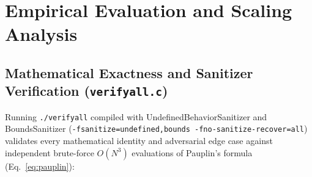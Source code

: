 \documentclass[11pt,a4paper]{article}
\makeatletter
\DeclareRobustCommand{\_}{\ifmmode\nfss@text{\textunderscore}\else\textunderscore\allowbreak\fi}
\theoremstyle{definition}
\makeatother
\begin{document}
\section{Empirical Evaluation and Scaling Analysis}
\label{sec:experiments}

\subsection{Mathematical Exactness and Sanitizer Verification (\texttt{verify\_all.c})}
Running \texttt{./verify\_all} compiled with Undefined\-Behavior\-Sanitizer and Bounds\-Sanitizer (\texttt{-fsanitize=undefined,bounds -fno-sanitize-recover=all}) validates every mathematical identity and adversarial edge case against independent brute-force $O(N^3)$ evaluations of Pauplin's formula (Eq.~\eqref{eq:pauplin}):
\end{document}
